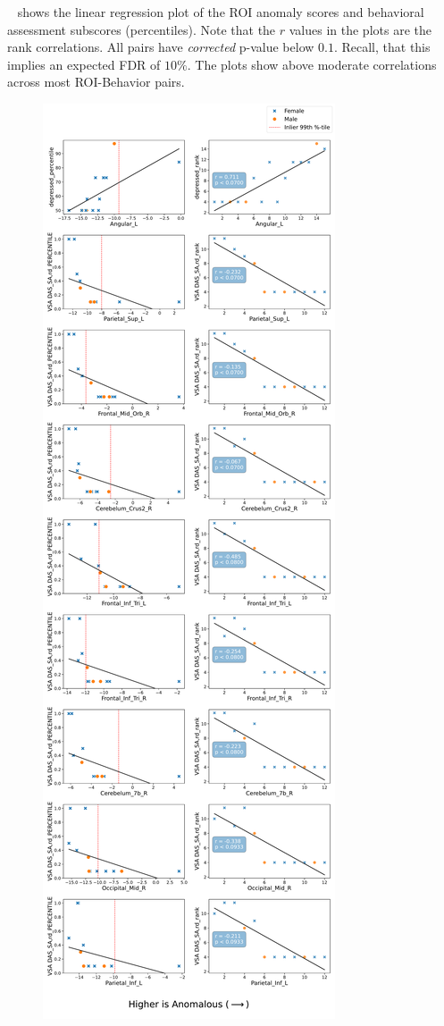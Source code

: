 ~ shows the linear regression plot of the ROI anomaly scores and behavioral assessment subscores (percentiles). Note that the $r$ values in the plots are the rank correlations. All pairs have \textit{corrected} p-value below $0.1$. Recall, that this implies an expected FDR of $10\%$. The plots show above moderate correlations across most ROI-Behavior pairs.

\begin{figure}[tbhp!]
\centering
\includegraphics[width=\textwidth]{figures/rankcorrplot-1.pdf}

\end{figure}
